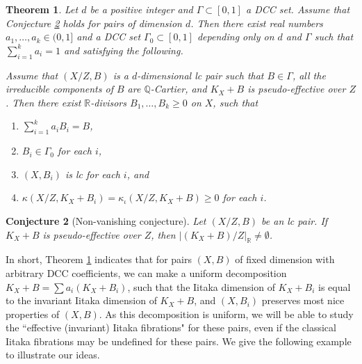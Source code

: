 \documentclass[11pt]{amsart}
\numberwithin{equation}{section}
\newcommand{\Qq}{\mathbb{Q}}
\newcommand{\Rr}{\mathbb{R}}
\newcommand{\Ii}{{\Gamma}}
\newtheorem{thm}{Theorem}[section]
\newtheorem{conj}[thm]{Conjecture}
\theoremstyle{definition}
\theoremstyle{definition}
\begin{document}
\begin{thm}\label{thm:dccdecomp}
Let $d$ be a positive integer and $\Ii\subset[0,1]$ a DCC set. Assume that Conjecture \ref{conj: non-vanishing} holds for pairs of dimension $d$. Then there exist real numbers $a_1,\dots,a_k\in (0,1]$ and a DCC set $\Ii_0\subset[0,1]$ depending only on $d$ and $\Ii$ such that $\sum_{i=1}^ka_i=1$ and satisfying the following. 

Assume that $(X/Z,B)$ is a $d$-dimensional lc pair such that $B\in\Ii$, all the irreducible components of $B$ are $\Qq$-Cartier, and $K_X+B$ is pseudo-effective over $Z$. Then there exist $\Rr$-divisors $B_1,\dots,B_k\geq 0$ on $X$, such that 
\begin{enumerate}
    \item $\sum_{i=1}^ka_iB_i=B$,
    \item $B_i\in\Ii_0$ for each $i$,
    \item $(X,B_i)$ is lc for each $i$, and
    \item $\kappa(X/Z,K_X+B_i)=\kappa_{\iota}(X/Z,K_X+B)\geq 0$ for each $i$.
\end{enumerate}
\end{thm}


\begin{conj}[Non-vanishing conjecture]\label{conj: non-vanishing}
Let $(X/Z,B)$ be an lc pair. If $K_X+B$ is pseudo-effective over $Z$, then $|(K_X+B)/Z|_{\Rr}\not=\emptyset$. 
\end{conj}


In short, Theorem \ref{thm:dccdecomp} indicates that for pairs $(X,B)$ of fixed dimension with arbitrary DCC coefficients, we can make a uniform decomposition $K_X+B=\sum a_i(K_X+B_i)$, such that the Iitaka dimension of $K_X+B_i$ is equal to the invariant Iitaka dimension of $K_X+B$, and $(X,B_i)$ preserves most nice properties of $(X,B)$. As this decomposition is uniform, we will be able to study the ``effective (invariant) Iitaka fibrations" for these pairs, even if the classical Iitaka fibrations may be undefined for these pairs. We give the following example to illustrate our ideas.
\end{document}
